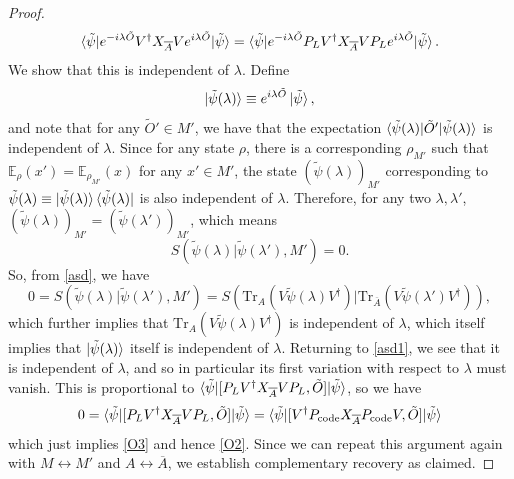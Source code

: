 \documentclass[12pt,a4paper]{report}
\numberwithin{equation}{section}
\newcommand{\ketbra}[2]{\ket{#1}\bra{#2}}
\newcommand{\ketbras}[1]{\ketbra{#1}{#1}}
\newcommand{\Pc}{P_{\text{code}}}
\newcommand{\ol}[1]{\overline{#1}}
\newcommand{\tr}{\text{Tr}}
\theoremstyle{definition}
\theoremstyle{theorem}
\theoremstyle{theorem}
\theoremstyle{example}
\theoremstyle{definition}
\begin{document}
\begin{proof}
	\begin{equation}\label{asd1}
		\braket{\tilde{\psi}|e^{-i\lambda\tilde{O}}V^{\dagger}X_{\ol{A}}Ve^{i\lambda\tilde{O}}|\tilde{\psi}}=\braket{\tilde{\psi}|e^{-i\lambda\tilde{O}}P_{L}V^{\dagger}X_{\ol{A}}VP_{L}e^{i\lambda\tilde{O}}|\tilde{\psi}}.
	\end{equation}
	We show that this is independent of $\lambda$. Define
	\begin{equation}
		\ket{\tilde{\psi}(\lambda)}\equiv e^{i\lambda\tilde{O}}\ket{\tilde{\psi}},
	\end{equation}
	and note that for any $\tilde{O}'\in M'$, we have that the expectation $\braket{\tilde{\psi}(\lambda)|\tilde{O}'|\tilde{\psi}(\lambda)}$ is independent of $\lambda$. Since for any state $\rho$, there is a corresponding $\rho_{M'}$ such that $\mathbb{E}_{\rho}(x')=\mathbb{E}_{\rho_{M'}}(x)$ for any $x'\in M'$, the state $(\tilde{\psi}(\lambda))_{M'}$ corresponding to $\tilde{\psi}(\lambda)\equiv\ketbras{\tilde{\psi}(\lambda)}$ is also independent of $\lambda$. Therefore, for any two $\lambda,\lambda'$, $(\tilde{\psi}(\lambda))_{M'}=(\tilde{\psi}(\lambda'))_{M'}$, which means
	\begin{equation}
		S(\tilde{\psi}(\lambda)|\tilde{\psi}(\lambda'),M')=0.
	\end{equation}
	So, from \ref{asd}, we have
	\begin{equation}
		0=S(\tilde{\psi}(\lambda)|\tilde{\psi}(\lambda'),M')=S(\tr_{{A}}(V\tilde{\psi}(\lambda) V^{\dagger})|\tr_{\ol{A}}(V\tilde{\psi}(\lambda') V^{\dagger})),
	\end{equation}
	which further implies that $\tr_{A}(V\tilde{\psi}(\lambda)V^{\dagger})$ is independent of $\lambda$, which itself implies that $\ket{\tilde{\psi}(\lambda)}$ itself is independent of $\lambda$. Returning to \ref{asd1}, we see that it is independent of $\lambda$, and so in particular its first variation with respect to $\lambda$ must vanish. This is proportional to $\braket{\tilde{\psi}|[P_{L}V^{\dagger}X_{\ol{A}}VP_{L},\tilde{O}]|\tilde{\psi}}$, so we have
	\begin{equation}
		0=\braket{\tilde{\psi}|[P_{L}V^{\dagger}X_{\ol{A}}VP_{L},\tilde{O}]|\tilde{\psi}}=\braket{\tilde{\psi}|[V^{\dagger}\Pc X_{\ol{A}}\Pc V,\tilde{O}]|\tilde{\psi}}
	\end{equation}
	which just implies \ref{O3} and hence \ref{O2}. Since we can repeat this argument again with $M\leftrightarrow M'$ and $A\leftrightarrow \ol{A}$, we establish complementary recovery as claimed.
\end{proof}
\end{document}

